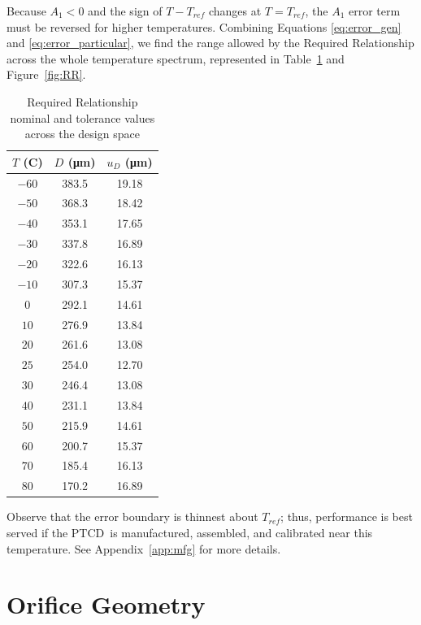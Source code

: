 \documentclass[12pt, letterpaper]{report}%
\newcommand{\device}{PTCD}
\begin{document}
\begin{appendices}
		Because $A_1 < 0$ and the sign of $T - T_{ref}$ changes at $T = T_{ref}$, the $A_1$ error term must be reversed for higher temperatures.
		Combining Equations \eqref{eq:error_gen} and \eqref{eq:error_particular}, we find the range allowed by the Required Relationship across the whole temperature spectrum, represented in Table~\ref{tab:RR} and Figure~\ref{fig:RR}.

		\begin{table}[H]
			\centering
			\caption{Required Relationship nominal and tolerance values across the design space}
			\label{tab:RR}
			\begin{tabular}{ccc}
				\toprule
				$T$ (\textdegree C) & $D$ (\si{\micro\meter}) & $u_D$ (\si{\micro\meter}) \\
				\midrule
				$-60$ & 383.5 & 19.18 \\
				$-50$ & 368.3 & 18.42 \\
				$-40$ & 353.1 & 17.65 \\
				$-30$ & 337.8 & 16.89 \\
				$-20$ & 322.6 & 16.13 \\
				$-10$ & 307.3 & 15.37 \\
				$0$   & 292.1 & 14.61 \\
				$10$  & 276.9 & 13.84 \\
				$20$  & 261.6 & 13.08 \\
				$25$  & 254.0 & 12.70 \\
				$30$  & 246.4 & 13.08 \\
				$40$  & 231.1 & 13.84 \\
				$50$  & 215.9 & 14.61 \\
				$60$  & 200.7 & 15.37 \\
				$70$  & 185.4 & 16.13 \\
				$80$  & 170.2 & 16.89 \\
				\bottomrule
			\end{tabular}
		\end{table}

		\vspace{1em}

		Observe that the error boundary is thinnest about $T_{ref}$; thus, performance is best served if the \device\ is manufactured, assembled, and calibrated near this temperature.
		See Appendix~\ref{app:mfg} for more details.

	\section{Orifice Geometry}
	\label{app:calcs:orifice_geometry}


\end{appendices}
\end{document}
